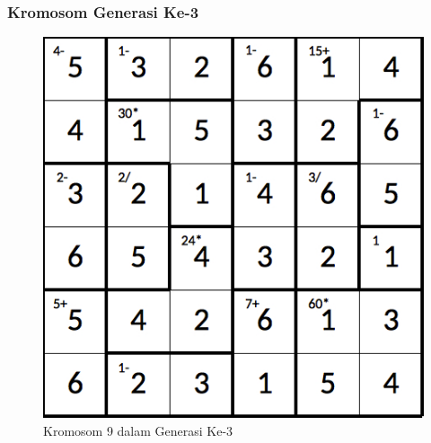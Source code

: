 \documentclass{beamer}
\begin{document}
\note{

}

\begin{frame}
\frametitle{Kromosom Generasi Ke-3}
\begin{figure}
\centering
\captionsetup{justification=centering}
\includegraphics[scale=0.333]{Gambar/hybridgenetic/Generation3Chromosome9}
\caption[Kromosom 9 dalam Generasi Ke-3]{Kromosom 9 dalam Generasi Ke-3}
\label{fig:analisisg3k9}
\end{figure}
\end{frame}

\note{

}
\end{document}
